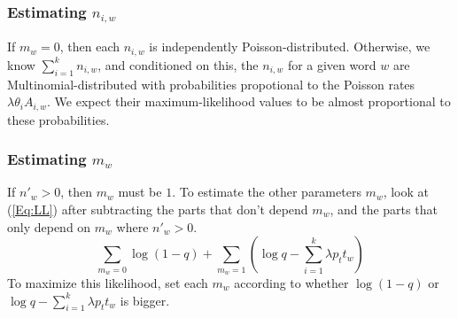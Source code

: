 \documentclass{article}
\begin{document}
\subsubsection{Estimating $n_{i,w}$}

If $m_w=0$, then each $n_{i,w}$ is independently Poisson-distributed.
Otherwise, we know $\sum_{i=1}^k n_{i,w}$, and conditioned on this, the
    $n_{i,w}$ for a given word $w$ are Multinomial-distributed with
    probabilities propotional to the Poisson rates $\lambda \theta_i A_{i,w}$.
We expect their maximum-likelihood values to be almost proportional to these
    probabilities.

\subsubsection{Estimating $m_w$}

If $n'_w>0$, then $m_w$ must be $1$.
To estimate the other parameters $m_w$, look at (\ref{Eq:LL}) after subtracting
    the parts that don't depend $m_w$, and the parts that only depend on $m_w$
    where $n'_w>0$.
$$\sum_{m_w=0} \log (1-q) + \sum_{m_w=1} \left( \log q - \sum_{i=1}^k \lambda p_t t_w \right)$$
To maximize this likelihood, set each $m_w$ according to whether $\log (1-q)$
    or $\log q - \sum_{i=1}^k \lambda p_t t_w$ is bigger.
\end{document}
